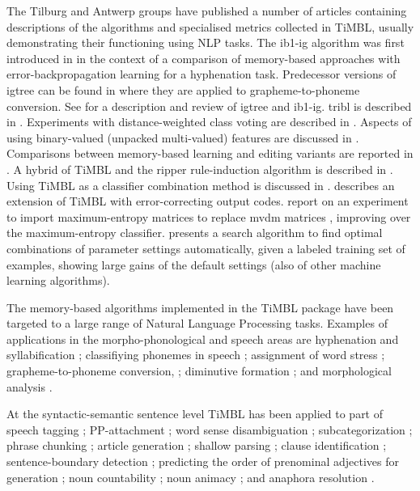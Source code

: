 \documentclass{report}
\begin{document}
The Tilburg and Antwerp groups have published a number of articles
containing descriptions of the algorithms and specialised metrics
collected in TiMBL, usually demonstrating their functioning using NLP
tasks. The {\sc ib1-ig} algorithm was first introduced in
\cite{Daelemans+92b} in the context of a comparison of memory-based
approaches with error-back\-propagation learning for a hyphenation
task.  Predecessor versions of {\sc igtree} can be found in
\cite{Daelemans+93c,VandenBosch+93} where they are applied to
grapheme-to-phoneme conversion.  See \cite{Daelemans+97} for a
description and review of {\sc igtree} and {\sc ib1-ig}. {\sc tribl}
is described in \cite{Daelemans+97d}.  Experiments with
distance-weighted class voting are described in
\cite{Zavrel97}. Aspects of using binary-valued (unpacked
multi-valued) features are discussed in \cite{VandenBosch+00}.
Comparisons between memory-based learning and editing variants are
reported in \cite{VandenBosch99,Daelemans+99}. A hybrid of TiMBL and
the {\sc ripper} rule-induction algorithm \cite{Cohen95} is described
in \cite{VandenBosch00,VandenBosch04}. Using TiMBL as a classifier
combination method is discussed in
\cite{Halteren+01}.  describes an extension of
TiMBL with error-correcting output codes. 
report on an experiment to import maximum-entropy matrices to replace
{\sc mvdm} matrices \cite{Hendrickx+04}, improving over the
maximum-entropy classifier.  presents a search
algorithm to find optimal combinations of parameter settings
automatically, given a labeled training set of examples, showing large
gains of the default settings (also of other machine learning
algorithms).

The memory-based algorithms implemented in the TiMBL package have been
targeted to a large range of Natural Language Processing
tasks. Examples of applications in the morpho-phonological and speech
areas are hyphenation and syllabification \cite{Daelemans+92b};
classifiying phonemes in speech \cite{Kocsor+00}; assignment of word
stress \cite{Daelemans+94}; grapheme-to-phoneme conversion,
\cite{VandenBosch+93,Daelemans+96}; diminutive formation
\cite{Daelemans+98a}; and morphological analysis
\cite{VandenBosch+96,VandenBosch+99}.

At the syntactic-semantic sentence level TiMBL has been applied to
part of speech tagging \cite{Daelemans+96b,Zavrel+99,Halteren+01};
PP-attachment \cite{Zavrel+97b}; word sense disambiguation
\cite{Veenstra+00,Stevenson+99,Kokkinakis00,Hoste+02,DeCadt+04};
subcategorization \cite{Buchholz98}; phrase chunking
\cite{Veenstra98,Sang+99}; article generation \cite{Minnen+00};
shallow parsing \cite{Daelemans+99a,Buchholz+99,Yeh00}; clause
identification \cite{Orasan00,Sang01}; sentence-boundary detection
\cite{Stevenson+00}; predicting the order of prenominal adjectives for
generation \cite{Malouf00}; noun countability \cite{Baldwin+03}; noun
animacy \cite{Orasan+01}; and anaphora resolution
\cite{Preiss02,Mitkov+02,Hoste05}.
\end{document}

